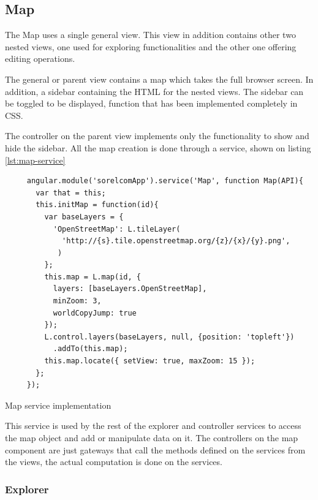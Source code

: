 \subsection{Map}

The Map uses a single general view. This view in addition contains other two nested views, one used for exploring functionalities and the other one offering editing operations.

The general or parent view contains a map which takes the full browser screen. In addition, a sidebar containing the HTML for the nested views. The sidebar can be toggled to be displayed, function that has been implemented completely in CSS.

The controller on the parent view implements only the functionality to show and hide the sidebar. All the map creation is done through a service, shown on listing \ref{lst:map-service}

\begin{listing}[ht]\centering
  \begin{minipage}{.75\textwidth}
    \begin{verbatim}
     angular.module('sorelcomApp').service('Map', function Map(API){
       var that = this;
       this.initMap = function(id){
         var baseLayers = {
           'OpenStreetMap': L.tileLayer(
             'http://{s}.tile.openstreetmap.org/{z}/{x}/{y}.png',
            )
         };
         this.map = L.map(id, {
           layers: [baseLayers.OpenStreetMap],
           minZoom: 3,
           worldCopyJump: true
         });
         L.control.layers(baseLayers, null, {position: 'topleft'})
           .addTo(this.map);
         this.map.locate({ setView: true, maxZoom: 15 });
       };
     });
    \end{verbatim}
  \end{minipage}
  \caption{Map service implementation}\label{lst:map-service}
\end{listing}

This service is used by the rest of the explorer and controller services to access the map object and add or manipulate data on it. The controllers on the map component are just gateways that call the methods defined on the services from the views, the actual computation is done on the services. 

\subsubsection*{Explorer}

